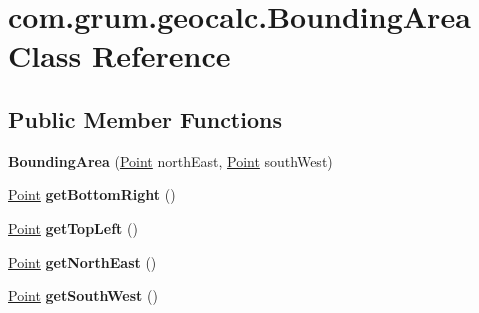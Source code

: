 \hypertarget{classcom_1_1grum_1_1geocalc_1_1_bounding_area}{}\section{com.\+grum.\+geocalc.\+Bounding\+Area Class Reference}
\label{classcom_1_1grum_1_1geocalc_1_1_bounding_area}
\subsection*{Public Member Functions}
\begin{DoxyCompactItemize}
\item 
\mbox{\label{classcom_1_1grum_1_1geocalc_1_1_bounding_area_aa302fed2b163f494aea374e935334774}} 
{\bfseries Bounding\+Area} (\mbox{\hyperlink{classcom_1_1grum_1_1geocalc_1_1_point}{Point}} north\+East, \mbox{\hyperlink{classcom_1_1grum_1_1geocalc_1_1_point}{Point}} south\+West)
\item 
\mbox{\label{classcom_1_1grum_1_1geocalc_1_1_bounding_area_a55e4a6c4a38f496eb7fe593878a07034}} 
\mbox{\hyperlink{classcom_1_1grum_1_1geocalc_1_1_point}{Point}} {\bfseries get\+Bottom\+Right} ()
\item 
\mbox{\label{classcom_1_1grum_1_1geocalc_1_1_bounding_area_adda9a281ca5c6a3376ac983e77d8c377}} 
\mbox{\hyperlink{classcom_1_1grum_1_1geocalc_1_1_point}{Point}} {\bfseries get\+Top\+Left} ()
\item 
\mbox{\label{classcom_1_1grum_1_1geocalc_1_1_bounding_area_aa21a9338c6916e5f6dd650049dbea6fb}} 
\mbox{\hyperlink{classcom_1_1grum_1_1geocalc_1_1_point}{Point}} {\bfseries get\+North\+East} ()
\item 
\mbox{\label{classcom_1_1grum_1_1geocalc_1_1_bounding_area_a343d21586222cd6c6c2d8c37871665ff}} 
\mbox{\hyperlink{classcom_1_1grum_1_1geocalc_1_1_point}{Point}} {\bfseries get\+South\+West} ()
\item 
\mbox{\label{classcom_1_1grum_1_1geocalc_1_1_bounding_area_ae284412dbb70060d09873cdc3901da13}} 

\end{DoxyCompactItemize}
